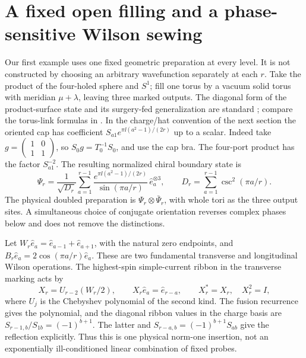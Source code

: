 \section{A fixed open filling and a phase-sensitive Wilson sewing}\label{sec:fixedcap}

Our first example uses one fixed geometric preparation at every level. It is not constructed by choosing an arbitrary wavefunction separately at each \(r\). Take the product of the four-holed sphere and \(S^1\); fill one torus by a vacuum solid torus with meridian \(\mu+\lambda\), leaving three marked outputs. The diagonal form of the product-surface state and its surgery-fed generalization are standard \cite[\S\S3.3,4]{BC}; compare the torus-link formulas in \cite[\S4]{BDFKLP}. In the charge/hat convention of the next section the oriented cap has coefficient \(S_{a1}e^{\pi\ii(a^2-1)/(2r)}\) up to a scalar. Indeed take \(g=\left(\begin{smallmatrix}1&0\\1&1\end{smallmatrix}\right)\), so \(S_0g=T_0^{-1}S_0\), and use the cap bra. The four-port product has the factor \(S_{a1}^{-2}\). The resulting normalized chiral boundary state is
\begin{equation}
 \Psi_r=\frac{1}{\sqrt{D_r}}\sum_{a=1}^{r-1}
     \frac{e^{\pi\ii(a^2-1)/(2r)}}{\sin(\pi a/r)}\,\hat e_a^{\otimes3},
 \qquad D_r=\sum_{a=1}^{r-1}\csc^2(\pi a/r).
 \label{eq:open-example}
\end{equation}
The physical doubled preparation is \(\Psi_r\otimes\bar\Psi_r\), with whole tori as the three output sites. A simultaneous choice of conjugate orientation reverses complex phases below and does not remove the distinctions.

Let \(W_r\hat e_a=\hat e_{a-1}+\hat e_{a+1}\), with the natural zero endpoints, and \(B_r\hat e_a=2\cos(\pi a/r)\hat e_a\). These are two fundamental transverse and longitudinal Wilson operations. The highest-spin simple-current ribbon in the transverse marking acts by
\begin{equation}
 X_r=U_{r-2}(W_r/2),\qquad X_r\hat e_a=\hat e_{r-a},
 \qquad X_r^*=X_r,\quad X_r^2=I,
 \label{eq:simple}
\end{equation}
where \(U_j\) is the Chebyshev polynomial of the second kind. The fusion recurrence gives the polynomial, and the diagonal ribbon values in the charge basis are \(S_{r-1,b}/S_{1b}=(-1)^{b+1}\). The latter and \(S_{r-a,b}=(-1)^{b+1}S_{ab}\) give the reflection explicitly. Thus this is one physical norm-one insertion, not an exponentially ill-conditioned linear combination of fixed probes.


